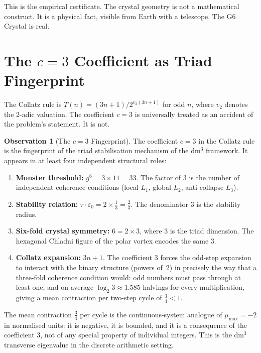 \documentclass[11pt]{article}
\theoremstyle{plain}
\theoremstyle{definition}
\newtheorem{observation}{Observation}
\begin{document}
This is the empirical certificate. The crystal geometry is not a
mathematical construct. It is a physical fact, visible from Earth
with a telescope. The G6 Crystal is real.

\section{The $c = 3$ Coefficient as Triad Fingerprint}

The Collatz rule is $T(n) = (3n+1)/2^{v_2(3n+1)}$ for odd $n$,
where $v_2$ denotes the 2-adic valuation. The coefficient $c = 3$
is universally treated as an accident of the problem's statement.
It is not.

\begin{observation}[The $c = 3$ Fingerprint]
The coefficient $c = 3$ in the Collatz rule is the fingerprint of
the triad stabilisation mechanism of the dm$^3$ framework. It appears
in at least four independent structural roles:
\begin{enumerate}[label=\arabic*., leftmargin=*]
  \item \textbf{Monster threshold:} $g^6 = 3 \times 11 = 33$. The
    factor of 3 is the number of independent coherence conditions
    (local $L_1$, global $L_2$, anti-collapse $L_3$).
  \item \textbf{Stability relation:} $\tau \cdot \varepsilon_0 = 2 \times
    \tfrac{1}{3} = \tfrac{2}{3}$. The denominator 3 is the stability
    radius.
  \item \textbf{Six-fold crystal symmetry:} $6 = 2 \times 3$, where 3
    is the triad dimension. The hexagonal Chladni figure of the polar
    vortex encodes the same 3.
  \item \textbf{Collatz expansion:} $3n + 1$. The coefficient 3 forces
    the odd-step expansion to interact with the binary structure
    (powers of~2) in precisely the way that a three-fold coherence
    condition would: odd numbers must pass through at least one, and
    on average $\log_2 3 \approx 1.585$ halvings for every
    multiplication, giving a mean contraction per two-step cycle of
    $\frac{3}{4} < 1$.
\end{enumerate}
\end{observation}

The mean contraction $\frac{3}{4}$ per cycle is the continuous-system
analogue of $\mu_{\max} = -2$ in normalised units: it is negative,
it is bounded, and it is a consequence of the coefficient 3, not of
any special property of individual integers. This is the dm$^3$
transverse eigenvalue in the discrete arithmetic setting.
\end{document}
